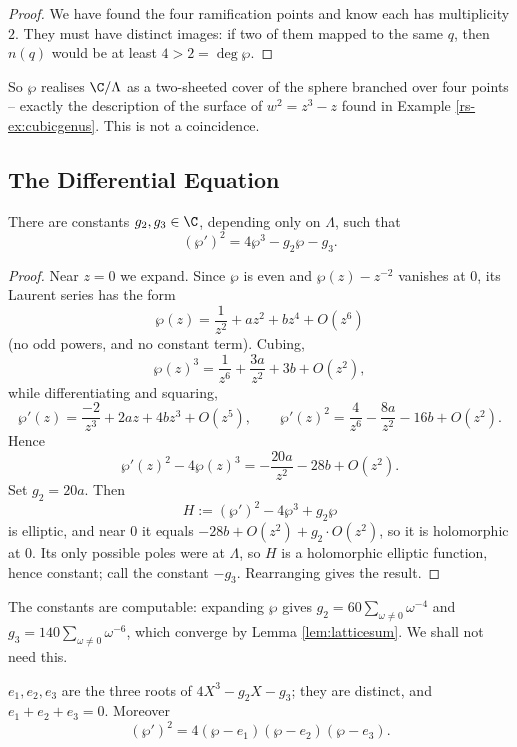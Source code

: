 \begin{proof}
	We have found the four ramification points and know each has multiplicity $2$. They
	must have distinct images: if two of them mapped to the same $q$, then $n(q)$ would be
	at least $4 > 2 = \deg\wp$.
\end{proof}

So $\wp$ realises $\C/\Lambda$ as a two-sheeted cover of the sphere branched over four
points -- exactly the description of the surface of $w^2 = z^3-z$ found in Example
\ref{rs-ex:cubicgenus}. This is not a coincidence.

\subsection{The Differential Equation}

\begin{proposition}\label{prop:wpode}
	There are constants $g_2, g_3 \in \C$, depending only on $\Lambda$, such that
	$$
	(\wp')^2 = 4\wp^3 - g_2\wp - g_3.
	$$
\end{proposition}

\begin{proof}
	Near $z = 0$ we expand. Since $\wp$ is even and $\wp(z) - z^{-2}$ vanishes at $0$, its
	Laurent series has the form
	$$
	\wp(z) = \frac{1}{z^2} + az^2 + bz^4 + O(z^6)
	$$
	(no odd powers, and no constant term). Cubing,
	$$
	\wp(z)^3 = \frac{1}{z^6} + \frac{3a}{z^2} + 3b + O(z^2),
	$$
	while differentiating and squaring,
	$$
	\wp'(z) = \frac{-2}{z^3}+2az+4bz^3+O(z^5), \qquad
	\wp'(z)^2 = \frac{4}{z^6} - \frac{8a}{z^2} - 16 b + O(z^2).
	$$
	Hence
	$$
	\wp'(z)^2 - 4\wp(z)^3 = -\frac{20a}{z^2} - 28b + O(z^2).
	$$
	Set $g_2 = 20a$. Then
	$$
	H := (\wp')^2 - 4\wp^3 + g_2\wp
	$$
	is elliptic, and near $0$ it equals $-28b + O(z^2) + g_2 \cdot O(z^2)$, so it is
	holomorphic at $0$. Its only possible poles were at $\Lambda$, so $H$ is a holomorphic
	elliptic function, hence constant; call the constant $-g_3$. Rearranging gives the
	result.
\end{proof}

\begin{remark}
	The constants are computable: expanding $\wp$ gives
	$g_2 = 60\sum_{\omega\neq0}\omega^{-4}$ and $g_3 = 140\sum_{\omega\neq0}\omega^{-6}$,
	which converge by Lemma \ref{lem:latticesum}. We shall not need this.
\end{remark}

\begin{corollary}\label{cor:eiroots}
	$e_1, e_2, e_3$ are the three roots of $4X^3 - g_2X - g_3$; they are distinct, and
	$e_1+e_2+e_3 = 0$. Moreover
	$$
	(\wp')^2 = 4(\wp - e_1)(\wp-e_2)(\wp-e_3).
	$$
\end{corollary}

